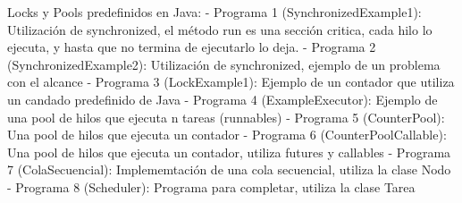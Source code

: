 Locks y Pools predefinidos en Java:
        - Programa 1 (SynchronizedExample1): Utilización de synchronized, el método run es una sección critica, cada hilo lo ejecuta, y hasta que no termina de ejecutarlo lo deja. 
        - Programa 2 (SynchronizedExample2): Utilización de synchronized, ejemplo de un problema con el alcance
        - Programa 3 (LockExample1): Ejemplo de un contador que utiliza un candado predefinido de Java 
        - Programa 4 (ExampleExecutor): Ejemplo de una pool de hilos que ejecuta n tareas (runnables)
        - Programa 5 (CounterPool): Una pool de hilos que ejecuta un contador
        - Programa 6 (CounterPoolCallable): Una pool de hilos que ejecuta un contador, utiliza futures y callables
        - Programa 7 (ColaSecuencial): Implememtación de una cola secuencial, utiliza la clase Nodo
        - Programa 8 (Scheduler): Programa para completar, utiliza la clase Tarea